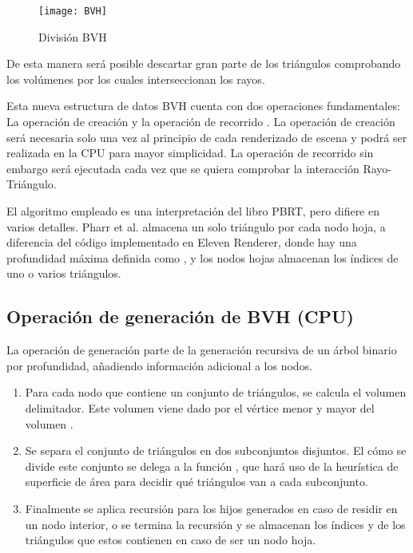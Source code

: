 \begin{figure}
    \centering
	\texttt{[image: BVH]}
	\caption{División BVH}
	\label{fig:label}
\end{figure}

De esta manera será posible descartar gran parte de los triángulos comprobando los volúmenes por los cuales interseccionan los rayos.

Esta nueva estructura de datos BVH cuenta con dos operaciones fundamentales: La operación de creación  y la operación de recorrido . La operación de creación será necesaria solo una vez al principio de cada renderizado de escena y podrá ser realizada en la CPU para mayor simplicidad. La operación de recorrido sin embargo será ejecutada cada vez que se quiera comprobar la interacción Rayo-Triángulo.

El algoritmo empleado es una interpretación del libro PBRT, pero difiere en varios detalles. Pharr et al. \cite{pharr2016physically} almacena un solo triángulo por cada nodo hoja, a diferencia del código implementado en Eleven Renderer, donde hay una profundidad máxima definida como , y los nodos hojas almacenan los índices de uno o varios triángulos. 

\subsection{Operación de generación de BVH (CPU)}

La operación de generación parte de la generación recursiva de un árbol binario por profundidad, añadiendo información adicional a los nodos.

\begin{enumerate}
	
\item Para cada nodo que contiene un conjunto de triángulos, se calcula el volumen delimitador. Este volumen viene dado por el vértice menor y mayor del volumen .

\item Se separa el conjunto de triángulos en dos subconjuntos disjuntos. El cómo se divide este conjunto se delega a la función , que hará uso de la heurística de superficie de área para decidir qué triángulos van a cada subconjunto.

\item Finalmente se aplica recursión para los hijos generados en caso de residir en un nodo interior, o se termina la recursión y se almacenan los índices  y  de los triángulos que estos contienen en caso de ser un nodo hoja.

\end{enumerate}

